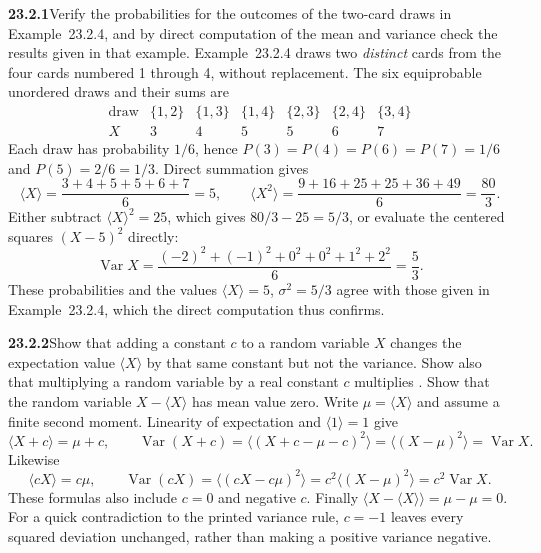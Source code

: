 \par\bigskip
\noindent\textbf{23.2.1}\quad Verify the probabilities for the
outcomes of the two-card draws in Example~23.2.4, and by direct
computation of the mean and variance check the results given in
that example.
\solution
Example~23.2.4 draws two \emph{distinct} cards from the four cards
numbered 1 through 4, without replacement. The six equiprobable
unordered draws and their sums are
\[
\begin{array}{c|rrrrrr}
\text{draw}&\{1,2\}&\{1,3\}&\{1,4\}&\{2,3\}&\{2,4\}&\{3,4\}\\
X&3&4&5&5&6&7
\end{array}
\]
Each draw has probability $1/6$, hence
$P(3)=P(4)=P(6)=P(7)=1/6$ and $P(5)=2/6=1/3$.
Direct summation gives
\[
\langle X\rangle=\frac{3+4+5+5+6+7}{6}=5,
\qquad \langle X^2\rangle=\frac{9+16+25+25+36+49}{6}=\frac{80}{3}.
\]
Either subtract $\langle X\rangle^2=25$, which gives $80/3-25=5/3$, or
evaluate the centered squares $(X-5)^2$ directly:
\[
\boxed{\operatorname{Var}X=
\frac{(-2)^2+(-1)^2+0^2+0^2+1^2+2^2}{6}=\frac53}.
\]
These probabilities and the values $\langle X\rangle=5$, $\sigma^2=5/3$
agree with those given in Example~23.2.4, which the direct computation
thus confirms.


\par\bigskip
\noindent\textbf{23.2.2}\quad Show that adding a constant $c$ to a
random variable $X$ changes the expectation value $\langle
X\rangle$ by that same constant but not the variance. Show also
that multiplying a random variable by a real constant $c$ multiplies
. Show that the random
variable $X-\langle X\rangle$ has mean value zero.
\solution
{}
Write $\mu=\langle X\rangle$ and assume a finite second moment.
Linearity of expectation and $\langle1\rangle=1$ give
\[
\langle X+c\rangle=\mu+c,\qquad
\operatorname{Var}(X+c)=\langle(X+c-\mu-c)^2\rangle
=\langle(X-\mu)^2\rangle=\operatorname{Var}X.
\]
Likewise
\[
\langle cX\rangle=c\mu,\qquad
\operatorname{Var}(cX)=\langle(cX-c\mu)^2\rangle
=c^2\langle(X-\mu)^2\rangle=c^2\operatorname{Var}X.
\]
These formulas also include $c=0$ and negative $c$.
Finally $\boxed{\langle X-\langle X\rangle\rangle=\mu-\mu=0}$.
For a quick contradiction to the printed variance rule, $c=-1$
leaves every squared deviation unchanged, rather than making a
positive variance negative.


